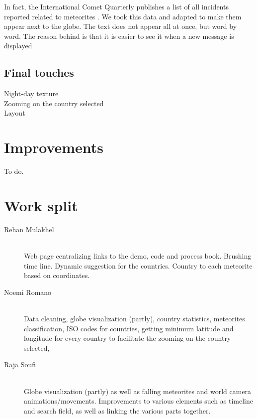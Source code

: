 \documentclass[10pt,conference,compsocconf]{IEEEtran}
\begin{document}
In fact, the International Comet Quarterly publishes a list of all incidents reported related to meteorites \cite{international_comet_quarterly}. We took this data and adapted to make them appear next to the globe. The text does not appear all at once, but word by word. The reason behind is that it is easier to see it when a new message is displayed.



\subsection{Final touches}

Night-day texture\\
Zooming on the country selected\\
Layout\\



\section{Improvements}
\label{sec:improvements}

To do.

\section{Work split}
\label{sec:work_split}

\begin{description}
\item[Rehan Mulakhel] \ \\
  Web page centralizing links to the demo, code and process book. Brushing time line. Dynamic suggestion for the countries. Country to each meteorite based on coordinates. 
\item[Noemi Romano] \ \\
  Data cleaning, globe visualization (partly), country statistics, meteorites classification, ISO codes for countries, getting minimum latitude and longitude for every country to facilitate the zooming on the country selected,  
\item[Raja Soufi] \ \\
  Globe visualization (partly) as well as falling meteorites and world camera animations/movements.
  Improvements to various elements such as timeline and search field, as well as linking the various parts together.
\end{description}






\end{document}
